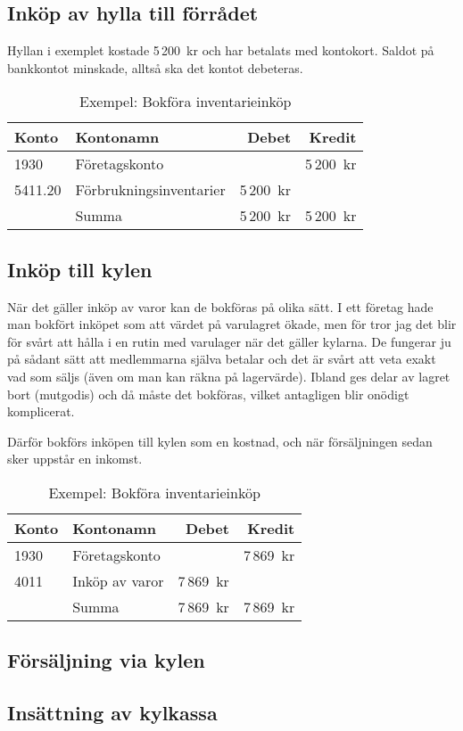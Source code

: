 \subsection{Inköp av hylla till förrådet}

Hyllan i exemplet kostade 5\,200~kr och har betalats med kontokort. Saldot på bankkontot minskade, alltså ska det kontot debeteras.

\begin{longtable}{llrr}
	\caption{Exempel: Bokföra inventarieinköp}\\
	Konto	& Kontonamn					& Debet		& Kredit\\ \toprule
	1930	& Företagskonto				& 			& 5\,200~kr\\
	5411.20	& Förbrukningsinventarier	& 5\,200~kr	& \\ \bottomrule
			& Summa						& 5\,200~kr	& 5\,200~kr
\end{longtable}

\subsection{Inköp till kylen}

När det gäller inköp av varor kan de bokföras på olika sätt. I ett företag hade man bokfört inköpet som att värdet på varulagret ökade, men för  tror jag det blir för svårt att hålla i en rutin med varulager när det gäller kylarna. De fungerar ju på sådant sätt att medlemmarna själva betalar och det är svårt att veta exakt vad som säljs (även om man kan räkna på lagervärde). Ibland ges delar av lagret bort (mutgodis) och då måste det bokföras, vilket antagligen blir onödigt komplicerat.

Därför bokförs inköpen till kylen som en kostnad, och när försäljningen sedan sker uppstår en inkomst.
\begin{longtable}{llrr}
	\caption{Exempel: Bokföra inventarieinköp}\\
	Konto	& Kontonamn					& Debet		& Kredit\\ \toprule
	1930	& Företagskonto				& 			& 7\,869~kr\\
	4011	& Inköp av varor			& 7\,869~kr	& \\ \bottomrule
			& Summa						& 7\,869~kr	& 7\,869~kr
\end{longtable}


\subsection{Försäljning via kylen}



\subsection{Insättning av kylkassa}
